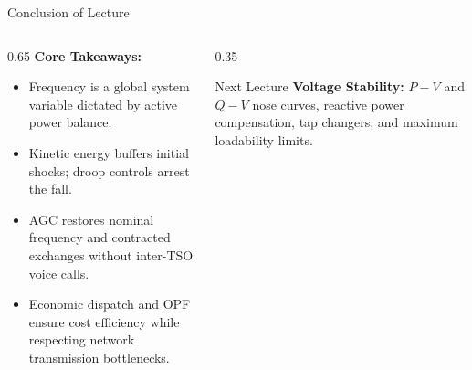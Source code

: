 \begin{frame}{Conclusion of Lecture}
\begin{columns}[T]
\begin{column}{0.65\textwidth}
    \footnotesize
    \textbf{Core Takeaways:}
    \begin{itemize}\setlength{\itemsep}{3pt}
        \item Frequency is a global system variable dictated by active power balance.
        \item Kinetic energy buffers initial shocks; droop controls arrest the fall.
        \item AGC restores nominal frequency and contracted exchanges without inter-TSO voice calls.
        \item Economic dispatch and OPF ensure cost efficiency while respecting network transmission bottlenecks.
    \end{itemize}
\end{column}
\begin{column}{0.35\textwidth}
    \begin{block}{Next Lecture}
    \scriptsize
    \textbf{Voltage Stability:}
    $P-V$ and $Q-V$ nose curves, reactive power compensation, tap changers, and maximum loadability limits.
    \end{block}
\end{column}
\end{columns}
\end{frame}
